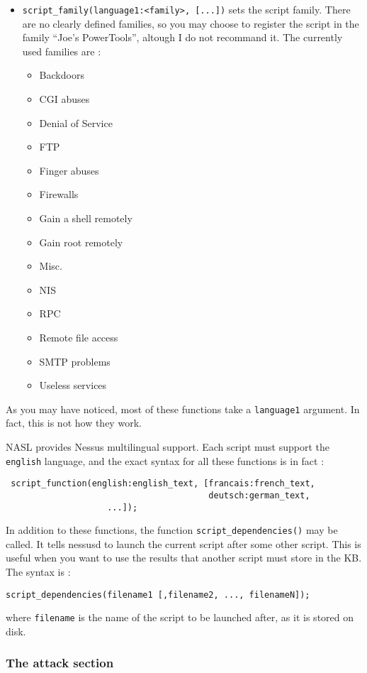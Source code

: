 \documentclass{article}
\begin{document}
\begin{itemize}
\item \verb+script_family(language1:<family>, [...])+ sets the script family.
There are no clearly defined families, so you may choose to register
the script in the family ``Joe's PowerTools'', altough I do not recommand it.
The currently used families are : 
	\begin{itemize}
	\item Backdoors
	\item CGI abuses
	\item Denial of Service
	\item FTP
	\item Finger abuses
	\item Firewalls
	\item Gain a shell remotely
	\item Gain root remotely
	\item Misc.
	\item NIS
	\item RPC
	\item Remote file access
	\item SMTP problems
	\item Useless services
	\end{itemize}
\end{itemize}

As you may have noticed, most of these functions take a \verb+language1+
argument. In fact, this is not how they work. 

NASL provides Nessus multilingual support. Each script must support the 
\verb+english+ language, and the exact syntax for all these functions
is in fact :
\begin{verbatim}
 script_function(english:english_text, [francais:french_text, 
                                        deutsch:german_text,
					...]);
\end{verbatim}


In addition to these functions, the function \verb+script_dependencies()+ may be
called. It tells nessusd to launch the current script after some other script.
This is useful when you want to use the results that another script must
store in the KB. The syntax is :
\begin{verbatim}
script_dependencies(filename1 [,filename2, ..., filenameN]);
\end{verbatim}

where \verb+filename+ is the name of the script to be launched after, 
as it is stored on disk.


\subsubsection{The attack section}
\end{document}
